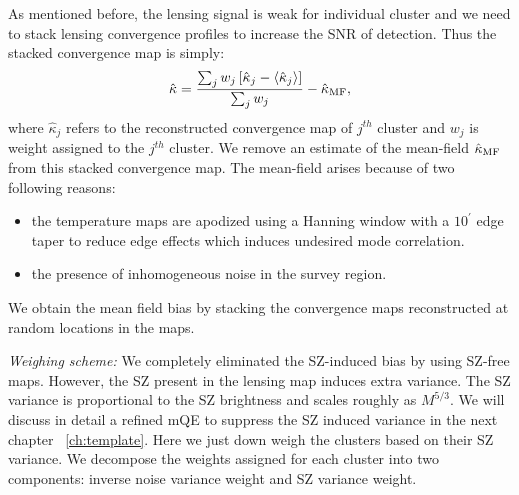 As mentioned before, the lensing signal is weak for individual cluster and we need to stack lensing convergence profiles to increase the SNR of detection.
 Thus the stacked convergence map is simply: 
 \begin{equation}
 \hat{\kappa} = \frac{\sum_j  w_j \left[ \hat{\kappa}_{j} - \left< \hat{\kappa}_{j} \right> \right]}{\sum_j w_j} - \hat{\kappa}_{\rm MF},
 \end{equation}
 where $\hat{\kappa}_{j}$ refers to the reconstructed convergence map of $j^{th}$ cluster %
 and  $w_{j}$ is weight assigned to the $j^{th}$ cluster.
We remove an estimate of the mean-field $\hat{\kappa}_{\rm MF}$ from this stacked convergence map.
The mean-field arises because of two following reasons:
\begin{itemize}
\item  the temperature maps are apodized using a Hanning window with a $10^{\prime}$ edge taper to reduce edge effects which induces undesired mode correlation.
\item the presence of inhomogeneous noise in the survey region.
\end{itemize}
We obtain the mean field bias by stacking the convergence maps reconstructed at \howmanyrandomsforMF{} random locations in the maps. 


{\it Weighing scheme:}  We completely eliminated the SZ-induced bias by using SZ-free maps. However, the SZ present in the lensing map induces extra variance.
The SZ variance is proportional to the SZ brightness and scales roughly as $M^{5/3}$.
We will discuss in detail a refined mQE to suppress the SZ induced variance in the next chapter ~\ref{ch:template}.
 Here we just down weigh the clusters based on their SZ variance.
We decompose the weights assigned for each cluster into two components: inverse noise variance weight and SZ variance weight. 
 
